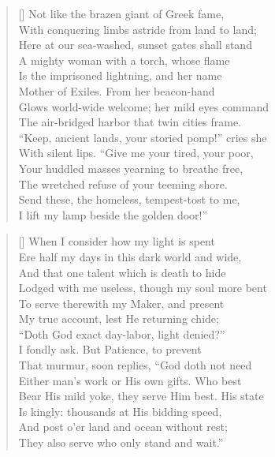 \documentclass[../butidigress.tex]{subfiles}
\begin{document}
\setlength{\versewidth}{45ex}
\begin{verse}[\versewidth]
Not like the brazen giant of Greek fame,         \\
With conquering limbs astride from land to land; \\
Here at our sea-washed, sunset gates shall stand \\
A mighty woman with a torch, whose flame         \\
Is the imprisoned lightning, and her name        \\
Mother of Exiles. From her beacon-hand           \\
Glows world-wide welcome; her mild eyes command \\
The air-bridged harbor that twin cities frame. \\
``Keep, ancient lands, your storied pomp!'' cries she \\
With silent lips. ``Give me your tired, your poor, \\
Your huddled masses yearning to breathe free, \\
The wretched refuse of your teeming shore. \\
Send these, the homeless, tempest-tost to me, \\
I lift my lamp beside the golden door!'' \\
\end{verse}

\newpage

\setlength{\versewidth}{45ex}
\begin{verse}[\versewidth]
When I consider how my light is spent \\
\vin Ere half my days in this dark world and wide, \\
\vin And that one talent which is death to hide \\
Lodged with me useless, though my soul more bent \\
To serve therewith my Maker, and present \\
\vin My true account, lest He returning chide; \\
\vin ``Doth God exact day-labor, light denied?'' \\
I fondly ask. But Patience, to prevent \\
That murmur, soon replies, ``God doth not need \\
\vin Either man’s work or His own gifts. Who best \\
\vin Bear His mild yoke, they serve Him best. His state \\
Is kingly: thousands at His bidding speed, \\
And post o’er land and ocean without rest; \\
They also serve who only stand and wait.'' \\
\end{verse}
\end{document}
